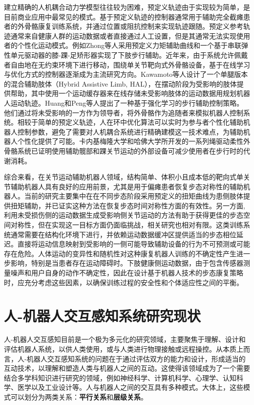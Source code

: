 建立精确的人机耦合动力学模型往往较为困难，预定义轨迹由于实现较为简单，是目前商业应用中最常见的模式。基于预定义轨迹的控制器通常用于辅助完全截瘫患者的外骨骼康复训练系统，并通过位置或阻抗控制来实现轨迹跟随。预定义参考轨迹通常来自健康人群的运动数据或者直接通过人工设置，但是其通常无法实现使用者的个性化运动模式。例如Zhong等人\cite{zhongGaitSymmetryEnhancement2022}采用预定义力矩辅助曲线和一个基于串联弹性单元驱动器的膝-踝-足矫形器实现了下肢步行辅助。近年来，由于系统允许佩戴者自由地在无约束环境下进行移动，围绕单关节靶向式外骨骼设备，基于在线学习与优化方式的控制器逐渐成为主流研究方向。Kawamoto等人\cite{kawamotoModificationHemiplegicCompensatory2015,kawamotoDevelopmentAssistController2014a}设计了一个单腿版本的混合辅助肢体（Hybrid Assistive Limb, HAL），在摆动阶段为受影响的肢体提供帮助，其中使用一个运动缓存器来在线存储未受影响肢体的运动数据用规划机器人运动轨迹。Huang和Peng等人\cite{huangLearningbasedWalkingAssistance2018,pengDataDrivenReinforcementLearning2020}提出了一种基于强化学习的步行辅助控制策略。他们通过将未受影响的一方作为领导者，将外骨骼作为追随者来模拟机器人控制系统。相较于简单的预定义轨迹，人在环中优化算法可以实时为参与者个性化辅助机器人控制参数，避免了需要对人机耦合系统进行精确建模这一技术难点，为辅助机器人个性化提供了可能。卡内基梅隆大学和哈佛大学\cite{dingHumanintheloopOptimizationHip2018,zhangHumanintheloopOptimizationExoskeleton2017a,awadSoftRoboticExosuit2017}所开发的一系列绳驱动柔性外骨骼系统已证明使用辅助髋部和踝关节运动的外部设备可减少使用者在步行时的代谢消耗。

综合来看，在关节运动辅助机器人领域，结构简单、体积小且成本低的靶向式单关节辅助机器人具有良好的应用前景，尤其是用于偏瘫患者恢复步态对称性的辅助机器人。当前的研究主要集中在在不同步态阶段采用预定义的扭矩曲线为患侧肢体提供扭矩辅助，并已证实这种方法在恢复步态时间对称性方面的有效性。另一方面, 利用未受损伤侧的运动数据生成受影响侧关节运动的方法有助于获得更佳的步态空间对称性，但在实现这一目标方面仍面临挑战，相关研究也相对有限。这类训练系统通常需要在结构化环境下进行，并依赖运动数据缓冲区提供适当的步态相位延迟。直接将运动信息映射到受影响的一侧可能导致辅助设备的行为不可预测或可能存在危险。人体运动的变异性和随机性对这种康复机器人训练的不确定性产生进一步影响，特别是当患者存在运动障碍时。下肢健康侧运动数据，由于包含传感器测量噪声和用户自身的动作不确定性，因此在设计基于机器人技术的步态康复策略时，应充分考虑这些因素，以确保训练过程的安全性和个体适应性之间的平衡。

\section{人-机器人交互感知系统研究现状}
人-机器人交互感知目前是一个极为多元化的研究领域，主要聚焦于理解、设计和评估机器人系统，以供人类使用，或与人类进行物理接触或远程操控。从本质上而言，人-机器人交互感知系统的问题在于通过评估双方的能力和设计，形成适当的互动技术，以理解和塑造人类与机器人之间的互动。这使得该领域成为了一个需要结合多学科知识进行研究的领域，例如神经科学、计算机科学、心理学、认知科学、医学以及工业设计等\cite{mohebbiHumanRobotInteractionRehabilitation2020a}。人与机器人之间的交互具有多种模式。大体上，这些模式可以划分为两类关系：\textbf{平行关系}和\textbf{层级关系}\cite{liuDesigningRobotBehavior}。

